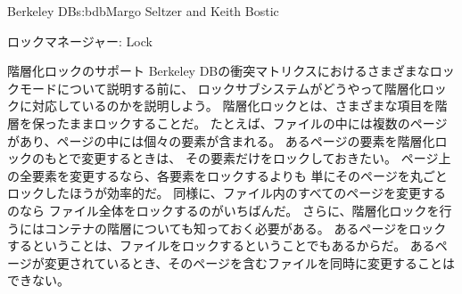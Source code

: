 \begin{aosachapter}{Berkeley DB}{s:bdb}{Margo Seltzer and Keith Bostic}
\begin{aosasect1}{ロックマネージャー: Lock}
\begin{aosasect2}{階層化ロックのサポート}
Berkeley DBの衝突マトリクスにおけるさまざまなロックモードについて説明する前に、
ロックサブシステムがどうやって階層化ロックに対応しているのかを説明しよう。
階層化ロックとは、さまざまな項目を階層を保ったままロックすることだ。
たとえば、ファイルの中には複数のページがあり、ページの中には個々の要素が含まれる。
あるページの要素を階層化ロックのもとで変更するときは、
その要素だけをロックしておきたい。
ページ上の全要素を変更するなら、各要素をロックするよりも
単にそのページを丸ごとロックしたほうが効率的だ。
同様に、ファイル内のすべてのページを変更するのなら
ファイル全体をロックするのがいちばんだ。
さらに、階層化ロックを行うにはコンテナの階層についても知っておく必要がある。
あるページをロックするということは、ファイルをロックするということでもあるからだ。
あるページが変更されているとき、そのページを含むファイルを同時に変更することはできない。


\end{aosasect2}
\end{aosasect1}
\end{aosachapter}
